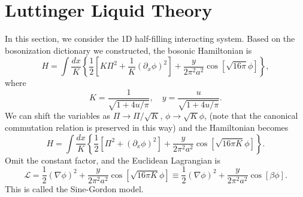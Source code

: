 \documentclass{SciPost}
\begin{document}
\section{Luttinger Liquid Theory}

In this section, we consider the 1D half-filling interacting system.
Based on the bosonization dictionary we constructed, the bosonic Hamiltonian is
\begin{equation*}
	H = \int \frac{dx}{K} \left\{ \frac{1}{2}\left[K \Pi^2 + \frac{1}{K}(\partial_x\phi)^2 \right] + \frac{y}{2\pi^2 a^2} \cos\left[\sqrt{16\pi}\phi\right] \right\},\end{equation*}
where
\begin{equation*}
	K = \frac{1}{\sqrt{1+4u/\pi}}, \quad y = \frac{u}{\sqrt{1+4u/\pi}}.
\end{equation*}
We can shift the variables as $\Pi \rightarrow \Pi/\sqrt K$, $\phi \rightarrow \sqrt K \phi$,
(note that the canonical commutation relation is preserved in this way) and the Hamiltonian becomes
\begin{equation*}
	H = \int \frac{dx}{K} \left\{ \frac{1}{2}\left[\Pi^2 + (\partial_x\phi)^2 \right] + \frac{y}{2\pi^2 a^2} \cos\left[\sqrt{16\pi K}\phi\right] \right\}.
\end{equation*}
Omit the constant factor, and the Euclidean Lagrangian is
\begin{equation}
	\mathcal L = \frac{1}{2}(\nabla \phi)^2 + \frac{y}{2\pi^2 a^2} \cos\left[\sqrt{16\pi K}\phi\right]
	\equiv \frac{1}{2}(\nabla \phi)^2 + \frac{y}{2\pi^2 a^2} \cos\left[\beta\phi\right].
\end{equation}
This is called the Sine-Gordon model.
\end{document}

